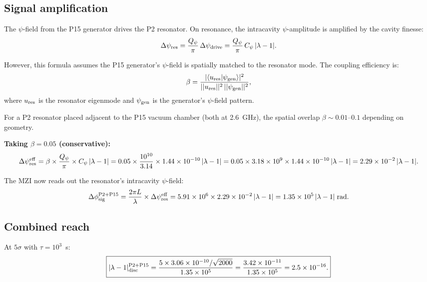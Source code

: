 \documentclass[11pt]{article}
\newcommand{\ee}[1]{\times 10^{#1}}
\newcommand{\lam}{\lambda}
\begin{document}
\subsection{Signal amplification}

The $\psi$-field from the P15 generator drives the P2 resonator.
On resonance, the intracavity $\psi$-amplitude is amplified by
the cavity finesse:
\begin{equation}
\Delta\psi_{\rm res} = \frac{Q_\psi}{\pi}\,\Delta\psi_{\rm drive}
= \frac{Q_\psi}{\pi}\,C_\psi\,|\lam-1|.
\label{eq:res-amplification}
\end{equation}

However, this formula assumes the P15 generator's $\psi$-field
is spatially matched to the resonator mode. The coupling efficiency
is:
\begin{equation}
\beta = \frac{|\langle u_{\rm res}|\psi_{\rm gen}\rangle|^2}
{||u_{\rm res}||^2\,||\psi_{\rm gen}||^2},
\end{equation}
where $u_{\rm res}$ is the resonator eigenmode and $\psi_{\rm gen}$
is the generator's $\psi$-field pattern.

For a P2 resonator placed adjacent to the P15 vacuum chamber
(both at 2.6~GHz), the spatial overlap $\beta \sim 0.01$--$0.1$
depending on geometry.

\textbf{Taking $\beta = 0.05$ (conservative):}
\begin{equation}
\Delta\psi_{\rm res}^{\rm eff} = \beta \times \frac{Q_\psi}{\pi}
\times C_\psi\,|\lam-1|
= 0.05 \times \frac{10^{10}}{3.14} \times 1.44\ee{-10}\,|\lam-1|
= 0.05 \times 3.18\ee{9} \times 1.44\ee{-10}\,|\lam-1|
= 2.29\ee{-2}\,|\lam-1|.
\end{equation}

The MZI now reads out the resonator's intracavity $\psi$-field:
\begin{equation}
\Delta\phi_{\rm sig}^{\rm P2+P15} = \frac{2\pi L}{\lambda}
\times \Delta\psi_{\rm res}^{\rm eff}
= 5.91\ee{6} \times 2.29\ee{-2}\,|\lam-1|
= 1.35\ee{5}\,|\lam-1|\;\text{rad}.
\end{equation}

\subsection{Combined reach}

At $5\sigma$ with $\tau = 10^3$~s:
\begin{equation}
\boxed{|\lam-1|_{\rm disc}^{\rm P2+P15}
= \frac{5 \times 3.06\ee{-10}/\sqrt{2000}}{1.35\ee{5}}
= \frac{3.42\ee{-11}}{1.35\ee{5}} = 2.5\ee{-16}.}
\end{equation}
\end{document}
